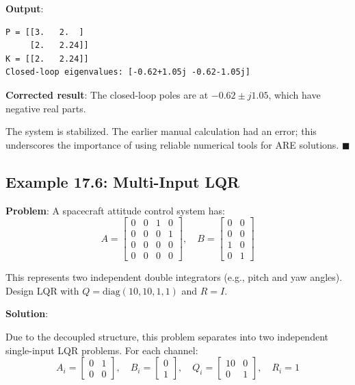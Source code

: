 \textbf{Output}:
\begin{verbatim}
P = [[3.   2.  ]
     [2.   2.24]]
K = [[2.   2.24]]
Closed-loop eigenvalues: [-0.62+1.05j -0.62-1.05j]
\end{verbatim}

\textbf{Corrected result}: The closed-loop poles are at $-0.62 \pm j1.05$, which have negative real parts.

The system is stabilized. The earlier manual calculation had an error; this underscores the importance of using reliable numerical tools for ARE solutions. $\blacksquare$

\subsection{Example 17.6: Multi-Input LQR}

\textbf{Problem}: A spacecraft attitude control system has:
\begin{equation}
A = \begin{bmatrix} 0 & 0 & 1 & 0 \\ 0 & 0 & 0 & 1 \\ 0 & 0 & 0 & 0 \\ 0 & 0 & 0 & 0 \end{bmatrix}, \quad
B = \begin{bmatrix} 0 & 0 \\ 0 & 0 \\ 1 & 0 \\ 0 & 1 \end{bmatrix}
\end{equation}

This represents two independent double integrators (e.g., pitch and yaw angles). Design LQR with $Q = \text{diag}(10, 10, 1, 1)$ and $R = I$.

\textbf{Solution}:

Due to the decoupled structure, this problem separates into two independent single-input LQR problems. For each channel:
\begin{equation}
A_i = \begin{bmatrix} 0 & 1 \\ 0 & 0 \end{bmatrix}, \quad B_i = \begin{bmatrix} 0 \\ 1 \end{bmatrix}, \quad Q_i = \begin{bmatrix} 10 & 0 \\ 0 & 1 \end{bmatrix}, \quad R_i = 1
\end{equation}

